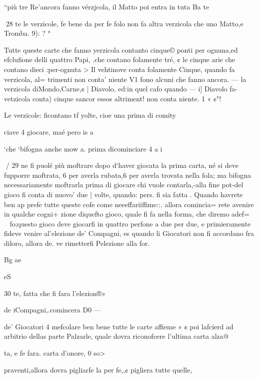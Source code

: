 \documentclass[12pt,a6paper]{article}
\begin{document}
“più tre Re'ancora fanno vérzjcola, il Matto poi entra in tuta
Ba te

 
28
te le verzicole, fe bene da per fe
folo non fa altra verzicola che
uno Matto,e Tromba. 9): ? °

Tutte queste carte che fanno
yerzicola contanto cinque©
ponti per ognuna,ed efclufione
delli quattro Papi, .che contano
folamente tré, ¢ le cinque arie
che contano dieci :per-ognuta >
Il vehtinove conta folamente
Cinque, quando fa verzicola, al=
trimenti non conta’ niente V1
fono alcuni che fanno ancora. —
la verzicola diMondo,Carne,¢ |
Diavolo, ed:in quel cafo quando —
i] Diavolo fa-vetzicola conta)
cinque sancor essos altriment!
non conta niente. 1 « ¢"!

Le verzicole: ficontano tf
yolte, cioe una prima di comity

ciave 4 giocare, maé pero is
a

 

‘che ‘bifogna anche mow a.
prima dicominciare 4 a i

 
/ 29
ne fi puolé più moftrare dopo
d‘haver giocata la prima carta,
né si deve fupporre moftrata, 6
per averla rubata,6 per averla
trovata nella fola; ma bifogna
necessariamente moftrarla prima di giocare chi vuole contarla,-alla fine pot-del gioco fi
conta di nuovo’ due | volte,
quando: pers. fi sia fatta .
Quando havrete ben ap
prefe tutte queste cofe come neeeffariiffime::. allora comincia=
rete avenire in qualche cogni+
zione diquefto gioco, quale fi fa
nella forma, che diremo adef=
~ fo;questo gioco deve giocarfi in
quattro perfone a due per due,
e primieramente fideve venire
al’elezione de’ Compagni, es
quando li Giocatori non fi accordano fra diloro, allora de.
ve rimetterfi Pelezione alla for.

Bg ae

 
 

 

 

 

eS

30
te, fatta che fi fara l’elezion®»

de iCompagni,.comincera D0 —

de’ Giocatori 4 mefcolare ben
bene tutte le carte affieme » ¢
poi lafcierd ad arbitrio dellas
parte Palzarle, quale dovra
riconofcere l’ultima carta alza@

ta, e fe fara. carta d’onore, 0 so>

praventi,allora dovra pigliarfe
la per fe,,¢ pigliera tutte quelle,
\end{document}
